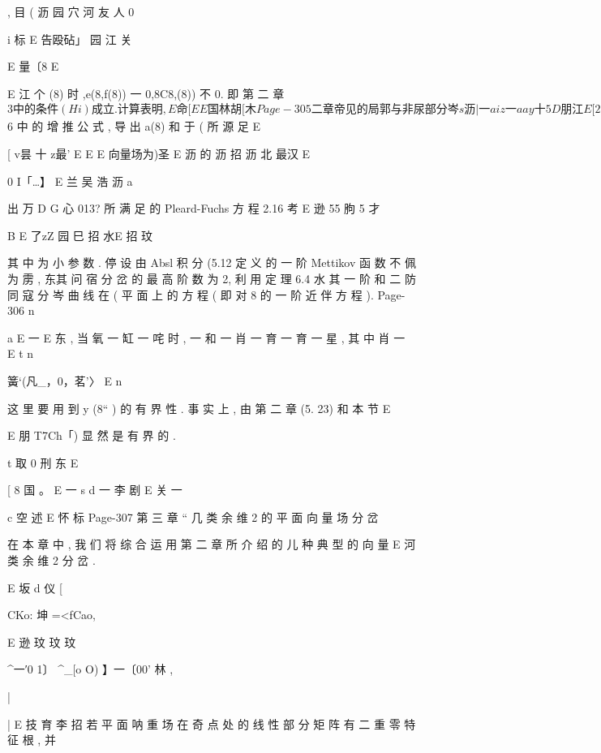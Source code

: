 {{{{{{{{{{{{{{{{, 目
( 沥 园 穴 河 友 人 0

i 标
E 告殴砧」 园 江 关

E 量〔8 E

E 江 个
(8) 时 ,e(8,f(8)) 一 0,8C8,(8)) 不 0. 即 第 二 章 $ 3 中 的 条 件

(Hi ) 成 立 . 计 算 表 明 ,

E
命
[
E
E 国 林胡
[ 木
Page-305
二 章 帝 见 的 局 郭 与 非 尿 部 分 岑

s 沥
| 一 aiz 一 aay 十 5
D 朋
江 E
[
2.7 证 明 定 理 .15.
E 芸 沥
功 , 服 有 ( 一 0 试 问 显 咏 必 有 8「( 旭 不 09
2.9 试 用 定 理 6.3 木 求 方 程 组
乏_一j=一z一′】+灼z+炮z仪十灼鹦狮
E 李 沥
ctutuot a
d
2.11 试 证 (6, 30) 式 中 的 丿 和 双 都 是 公 式 (6. 29 中 丁 ( 的 简 单
E 伟 江 口

2.13 对 5.15), 试 用 $ 6 中 的 增 推 公 式 , 导 出 a(8) 和 于 ( 所 源 足
E

[ v昙 十 z最' E
E
E 向量场为)圣 E 沥 的 沥 招 沥 北 最汉 E

0 I「…】 E 兰 吴 浩 沥 a

出 万 D G 心 013? 所 满 足 的 Pleard-Fuchs 方 程
2.16 考 E 逊 55 朐 5 才

B
E 了zZ 园 巳 招 水E 招 玟

其 中 为 小 参 数 . 停 设 由 Absl 积 分 (5.12 定 义 的 一 阶 Mettikov 函 数 不 佩 为
雳 , 东其 问 宿 分 岔 的 最 高 阶 数 为 2, 利 用 定 理 6.4 水 其 一 阶 和 二 防 同 寇 分 岑
曲 线 在 ( 平 面 上 的 方 程 ( 即 对 8 的 一 阶 近 伴 方 程 ).
Page-306
n

a
E 一
E
东 , 当 氧 一 缸 一 咤 时 , 一 和 一 肖 一 育 一 育 一 星 , 其 中 肖 一
E t
n

簧`(凡_，0，茗'〉 E n

这 里 要 用 到 y (8“ ) 的 有 界 性 . 事 实 上 , 由 第 二 章 (5. 23) 和 本 节
E

E 朋
T7Ch「) 显 然 是 有 界 的 .

t 取
0 刑 东
E

[
8 国 。
E
一
s
d 一
李 剧
E 关
一

c 空 述
E 怀 标
Page-307
第 三 章 “ 几 类 余 维 2 的 平 面 向 量 场 分 岔

在 本 章 中 , 我 们 将 综 合 运 用 第 二 章 所 介 绍 的 儿 种 典 型 的 向 量
E 河
类 余 维 2 分 岔 .

E 坂 d 仪 [

CKo: 坤 =<fCao,

E 逊
玟
玟
玟

^一′0 1〕 ^_[o O)
】一〔00' 林
,

|
{
|
E 技 育 李 招
若 平 面 呐 重 场 在 奇 点 处 的 线 性 部 分 矩 阵 有 二 重 零 特 征 根 , 并

}}}}}}}}}}}}}}}}}
